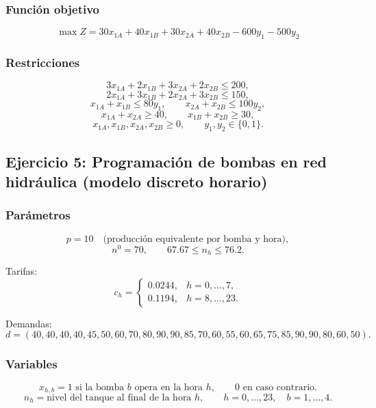 \documentclass[12pt,a4paper]{article}
\begin{document}
\subsubsection*{Función objetivo}
\[
\max Z = 30x_{1A}+40x_{1B}+30x_{2A}+40x_{2B}-600y_1-500y_2
\]

\subsubsection*{Restricciones}
\[
3x_{1A}+2x_{1B}+3x_{2A}+2x_{2B}\le 200,
\]
\[
2x_{1A}+3x_{1B}+2x_{2A}+3x_{2B}\le 150,
\]
\[
x_{1A}+x_{1B}\le 80y_1,\qquad x_{2A}+x_{2B}\le 100y_2,
\]
\[
x_{1A}+x_{2A}\ge 40,\qquad x_{1B}+x_{2B}\ge 30,
\]
\[
x_{1A},x_{1B},x_{2A},x_{2B}\ge 0,\qquad y_1,y_2\in\{0,1\}.
\]

\subsection{Ejercicio 5: Programación de bombas en red hidráulica (modelo discreto horario)}

\subsubsection*{Parámetros}
\[
p=10 \quad \text{(producción equivalente por bomba y hora)},
\]
\[
n^{0}=70,\qquad 67.67\le n_h \le 76.2.
\]

Tarifas:
\[
c_h=
\begin{cases}
0.0244, & h=0,\dots,7,\\
0.1194, & h=8,\dots,23.
\end{cases}
\]

Demandas:
\[
d=(40,40,40,40,45,50,60,70,80,90,90,85,70,60,55,60,65,75,85,90,90,80,60,50).
\]

\subsubsection*{Variables}
\[
x_{h,b}=1 \text{ si la bomba } b \text{ opera en la hora } h,\qquad 0 \text{ en caso contrario.}
\]
\[
n_h=\text{nivel del tanque al final de la hora } h,\qquad h=0,\dots,23,\quad b=1,\dots,4.
\]
\end{document}
